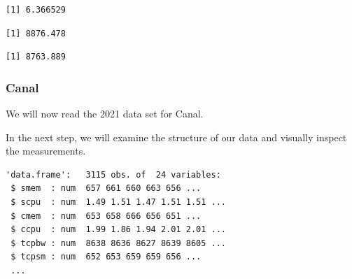 \begin{verbatim}
[1] 6.366529
\end{verbatim}

\begin{Shaded}
\begin{Highlighting}[]
\SpecialCharTok{\$}
\end{Highlighting}
\end{Shaded}

\begin{verbatim}
[1] 8876.478
\end{verbatim}

\begin{Shaded}
\begin{Highlighting}[]
\SpecialCharTok{\$}
\end{Highlighting}
\end{Shaded}

\begin{verbatim}
[1] 8763.889
\end{verbatim}

\subsubsection{Canal}

We will now read the 2021 data set for Canal.

\begin{Shaded}
\begin{Highlighting}[]
\OtherTok{\textless{}{-}} 
\OtherTok{\textless{}{-}} \NormalTok{(}\NormalTok{,}\NormalTok{))}
\end{Highlighting}
\end{Shaded}

In the next step, we will examine the structure of our data and visually
inspect the measurements.

\begin{Shaded}
\begin{Highlighting}[]
\end{Highlighting}
\end{Shaded}

\begin{verbatim}
'data.frame':   3115 obs. of  24 variables:
 $ smem  : num  657 661 660 663 656 ...
 $ scpu  : num  1.49 1.51 1.47 1.51 1.51 ...
 $ cmem  : num  653 658 666 656 651 ...
 $ ccpu  : num  1.99 1.86 1.94 2.01 2.01 ...
 $ tcpbw : num  8638 8636 8627 8639 8605 ...
 $ tcpsm : num  652 653 659 659 656 ...
 ...
\end{verbatim}


